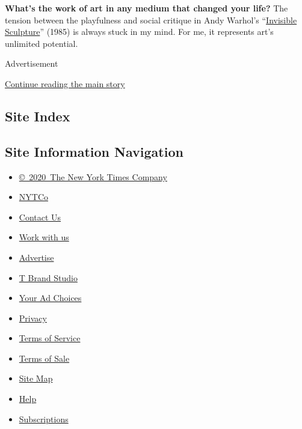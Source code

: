 \textbf{What's the work of art in any medium that changed your life?}
The tension between the playfulness and social critique in Andy Warhol's
``\href{https://www.dazeddigital.com/art-photography/article/42835/1/invisible-artworks-andy-warhol-yves-klein-david-hammons-kerry-james-marshall}{Invisible
Sculpture}'' (1985) is always stuck in my mind. For me, it represents
art's unlimited potential.

Advertisement

\protect\hyperlink{after-bottom}{Continue reading the main story}

\hypertarget{site-index}{%
\subsection{Site Index}\label{site-index}}

\hypertarget{site-information-navigation}{%
\subsection{Site Information
Navigation}\label{site-information-navigation}}

\begin{itemize}
\tightlist
\item
  \href{https://help.nytimes3xbfgragh.onion/hc/en-us/articles/115014792127-Copyright-notice}{©~2020~The
  New York Times Company}
\end{itemize}

\begin{itemize}
\tightlist
\item
  \href{https://www.nytco.com/}{NYTCo}
\item
  \href{https://help.nytimes3xbfgragh.onion/hc/en-us/articles/115015385887-Contact-Us}{Contact
  Us}
\item
  \href{https://www.nytco.com/careers/}{Work with us}
\item
  \href{https://nytmediakit.com/}{Advertise}
\item
  \href{http://www.tbrandstudio.com/}{T Brand Studio}
\item
  \href{https://www.nytimes3xbfgragh.onion/privacy/cookie-policy\#how-do-i-manage-trackers}{Your
  Ad Choices}
\item
  \href{https://www.nytimes3xbfgragh.onion/privacy}{Privacy}
\item
  \href{https://help.nytimes3xbfgragh.onion/hc/en-us/articles/115014893428-Terms-of-service}{Terms
  of Service}
\item
  \href{https://help.nytimes3xbfgragh.onion/hc/en-us/articles/115014893968-Terms-of-sale}{Terms
  of Sale}
\item
  \href{https://spiderbites.nytimes3xbfgragh.onion}{Site Map}
\item
  \href{https://help.nytimes3xbfgragh.onion/hc/en-us}{Help}
\item
  \href{https://www.nytimes3xbfgragh.onion/subscription?campaignId=37WXW}{Subscriptions}
\end{itemize}
